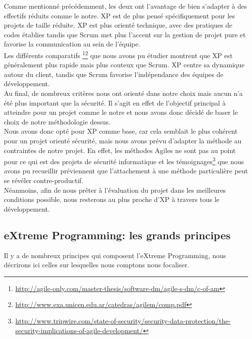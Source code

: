 \documentclass{../../res/univ-projet}
\begin{document}
	Comme mentionné précédemment, les deux ont l'avantage de bien s'adapter à des effectifs réduits comme le notre. XP est de plus pensé spécifiquement pour les projets de taille réduite. XP est plus orienté technique, avec des pratiques de codes établies tandis que Scrum met plus l'accent sur la gestion de projet pure et favorise la communication au sein de l'équipe.\\	
		
	Les différents comparatifs \footnote{\href{http://agile-only.com/master-thesis/software-dm/agile-s-dm/c-of-am}{http://agile-only.com/master-thesis/software-dm/agile-s-dm/c-of-am}}\footnote{\href{http://www.exa.unicen.edu.ar/catedras/agilem/comp.pdf}{http://www.exa.unicen.edu.ar/catedras/agilem/comp.pdf}} que nous avons pu étudier montrent que XP est généralement plus rapide mais plus couteux que Scrum. XP centre sa dynamique autour du client, tandis que Scrum favorise l'indépendance des équipes de développement.\\
		
	Au final, de nombreux critères nous ont orienté dans notre choix mais aucun n'a été plus important que la sécurité. Il s'agit en effet de l'objectif principal à atteindre pour un projet comme le notre et nous avons donc décidé de baser le choix de notre méthodologie dessus.\\
		
	Nous avons donc opté pour XP comme base, car cela semblait le plus cohérent pour un projet orienté sécurité, mais nous avons prévu d'adapter la méthode au contraintes de notre projet. En effet, les méthodes Agiles ne sont pas au point pour ce qui est des projets de sécurité informatique et les témoignages\footnote{\href{http://www.tripwire.com/state-of-security/security-data-protection/the-security-implications-of-agile-development/}{http://www.tripwire.com/state-of-security/security-data-protection/the-security-implications-of-agile-development/}} que nous avons pu recueillir préviennent que l'attachement à une méthode particulière peut se révéler contre-productif.\\

	Néanmoins, afin de nous prêter à l'évaluation du projet dans les meilleures conditions possible, nous resterons au plus proche d'XP à travers tous le développement.
	
\subsection{eXtreme Programming: les grands principes}
	Il y a de nombreux principes qui composent l'eXtreme Programming, nous décrirons ici celles sur lesquelles nous comptons nous focaliser.
\end{document}
